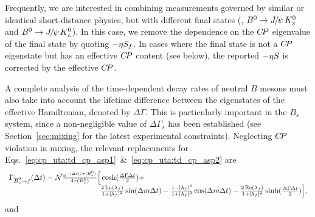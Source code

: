 Frequently, we are interested in combining measurements 
governed by similar or identical short-distance physics,
but with different final states
(\eg, $B^0 \to {J\mskip -3mu/\mskip -2mu\psi\mskip 2mu} K^0_{\scriptscriptstyle S}$ and $B^0 \to {J\mskip -3mu/\mskip -2mu\psi\mskip 2mu} K^0_{\scriptscriptstyle L}$).
In this case, we remove the dependence on the $C\!P$ eigenvalue 
of the final state by quoting $-{\eta} S_f$.
In cases where the final state is not a $C\!P$ eigenstate but has
an effective $C\!P$ content (see below),
the reported $-{\eta} S$ is corrected by the effective $C\!P$.

\label{sec:cp_uta:notations:Bs}

A complete analysis of the time-dependent decay rates of 
neutral $B$ mesons must also take into account the lifetime difference
between the eigenstates of the effective Hamiltonian, 
denoted by $\Delta \Gamma$.
This is particularly important in the $B_s$ system,
since a non-negligible value of $\Delta \Gamma_s$ has been established
(see Section~\ref{sec:mixing} for the latest experimental constraints).
Neglecting $C\!P$ violation in mixing,
the relevant replacements for 
Eqs.~\ref{eq:cp_uta:td_cp_asp1}~\&~\ref{eq:cp_uta:td_cp_asp2} 
are~\cite{Dunietz:2000cr}
\begin{equation}
  \label{eq:cp_uta:td_cp_bs_asp1}
  \begin{array}{lcr}
    \mc{2}{l}{
      \Gamma_{\Bsbar \to f} (\Delta t) = 
      {\cal N} %
      \frac{e^{-| \Delta t | / \tau(\Bs)}}{4\tau(\Bs)}
      \Big[ 
      \cosh(\frac{\Delta \Gamma \Delta t}{2}) +
    } & \hspace{40mm} \\
    \hspace{40mm} &
    \mc{2}{r}{
      \frac{2\, \Im(\lambda_f)}{1 + |\lambda_f|^2} \sin(\Delta m \Delta t) -
      \frac{1 - |\lambda_f|^2}{1 + |\lambda_f|^2} \cos(\Delta m \Delta t) -
      \frac{2\, \Re(\lambda_f)}{1 + |\lambda_f|^2} \sinh(\frac{\Delta \Gamma \Delta t}{2})
      \Big],
    } \\
  \end{array}
\end{equation}
and
